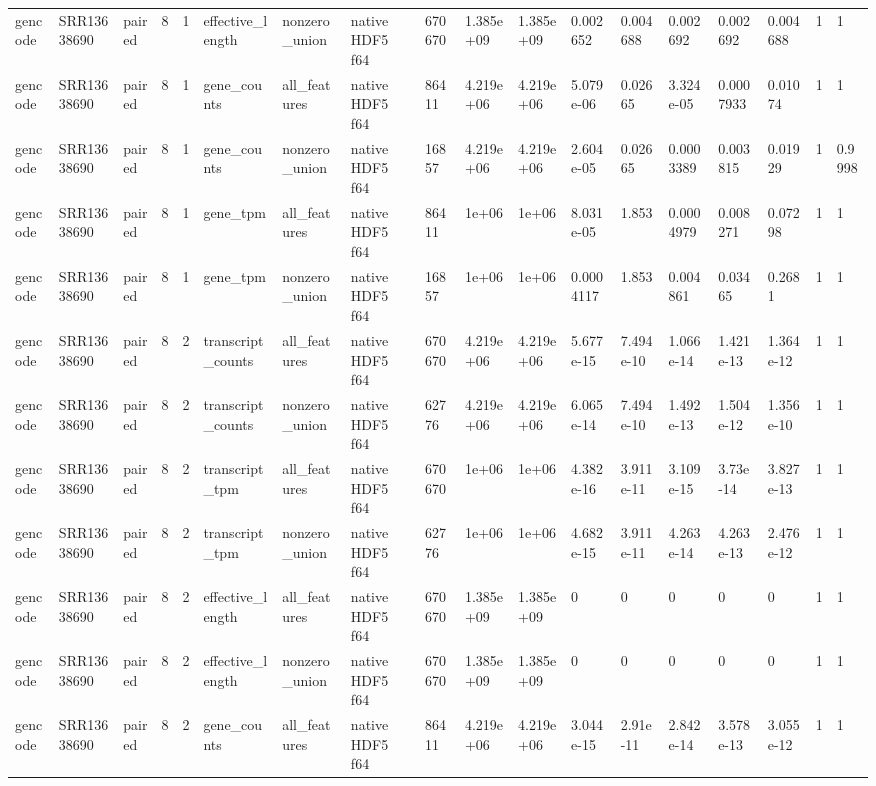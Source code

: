 \begin{tabular}{llllllllllllllllll}
gencode & SRR13638690 & paired & 8 & 1 & effective\_length & nonzero\_union & native HDF5 f64 & 670670 & 1.385e+09 & 1.385e+09 & 0.002652 & 0.004688 & 0.002692 & 0.002692 & 0.004688 & 1 & 1 \\
gencode & SRR13638690 & paired & 8 & 1 & gene\_counts & all\_features & native HDF5 f64 & 86411 & 4.219e+06 & 4.219e+06 & 5.079e-06 & 0.02665 & 3.324e-05 & 0.0007933 & 0.01074 & 1 & 1 \\
gencode & SRR13638690 & paired & 8 & 1 & gene\_counts & nonzero\_union & native HDF5 f64 & 16857 & 4.219e+06 & 4.219e+06 & 2.604e-05 & 0.02665 & 0.0003389 & 0.003815 & 0.01929 & 1 & 0.9998 \\
gencode & SRR13638690 & paired & 8 & 1 & gene\_tpm & all\_features & native HDF5 f64 & 86411 & 1e+06 & 1e+06 & 8.031e-05 & 1.853 & 0.0004979 & 0.008271 & 0.07298 & 1 & 1 \\
gencode & SRR13638690 & paired & 8 & 1 & gene\_tpm & nonzero\_union & native HDF5 f64 & 16857 & 1e+06 & 1e+06 & 0.0004117 & 1.853 & 0.004861 & 0.03465 & 0.2681 & 1 & 1 \\
gencode & SRR13638690 & paired & 8 & 2 & transcript\_counts & all\_features & native HDF5 f64 & 670670 & 4.219e+06 & 4.219e+06 & 5.677e-15 & 7.494e-10 & 1.066e-14 & 1.421e-13 & 1.364e-12 & 1 & 1 \\
gencode & SRR13638690 & paired & 8 & 2 & transcript\_counts & nonzero\_union & native HDF5 f64 & 62776 & 4.219e+06 & 4.219e+06 & 6.065e-14 & 7.494e-10 & 1.492e-13 & 1.504e-12 & 1.356e-10 & 1 & 1 \\
gencode & SRR13638690 & paired & 8 & 2 & transcript\_tpm & all\_features & native HDF5 f64 & 670670 & 1e+06 & 1e+06 & 4.382e-16 & 3.911e-11 & 3.109e-15 & 3.73e-14 & 3.827e-13 & 1 & 1 \\
gencode & SRR13638690 & paired & 8 & 2 & transcript\_tpm & nonzero\_union & native HDF5 f64 & 62776 & 1e+06 & 1e+06 & 4.682e-15 & 3.911e-11 & 4.263e-14 & 4.263e-13 & 2.476e-12 & 1 & 1 \\
gencode & SRR13638690 & paired & 8 & 2 & effective\_length & all\_features & native HDF5 f64 & 670670 & 1.385e+09 & 1.385e+09 & 0 & 0 & 0 & 0 & 0 & 1 & 1 \\
gencode & SRR13638690 & paired & 8 & 2 & effective\_length & nonzero\_union & native HDF5 f64 & 670670 & 1.385e+09 & 1.385e+09 & 0 & 0 & 0 & 0 & 0 & 1 & 1 \\
gencode & SRR13638690 & paired & 8 & 2 & gene\_counts & all\_features & native HDF5 f64 & 86411 & 4.219e+06 & 4.219e+06 & 3.044e-15 & 2.91e-11 & 2.842e-14 & 3.578e-13 & 3.055e-12 & 1 & 1 \\

\end{tabular}
